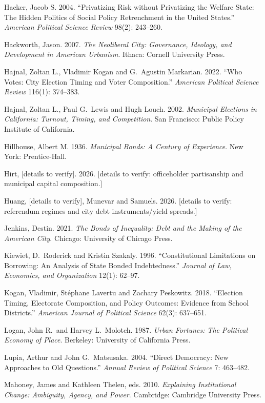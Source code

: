 Hacker, Jacob S. 2004. ``Privatizing Risk without Privatizing the Welfare State: The Hidden Politics of Social Policy Retrenchment in the United States.'' \emph{American Political Science Review} 98(2): 243--260.

Hackworth, Jason. 2007. \emph{The Neoliberal City: Governance, Ideology, and Development in American Urbanism}. Ithaca: Cornell University Press.

Hajnal, Zoltan L., Vladimir Kogan and G.\ Agustin Markarian. 2022. ``Who Votes: City Election Timing and Voter Composition.'' \emph{American Political Science Review} 116(1): 374--383.

Hajnal, Zoltan L., Paul G.\ Lewis and Hugh Louch. 2002. \emph{Municipal Elections in California: Turnout, Timing, and Competition}. San Francisco: Public Policy Institute of California.

Hillhouse, Albert M. 1936. \emph{Municipal Bonds: A Century of Experience}. New York: Prentice-Hall.

Hirt, [details to verify]. 2026. [details to verify: officeholder partisanship and municipal capital composition.]

Huang, [details to verify], Munevar and Samuels. 2026. [details to verify: referendum regimes and city debt instruments/yield spreads.]

Jenkins, Destin. 2021. \emph{The Bonds of Inequality: Debt and the Making of the American City}. Chicago: University of Chicago Press.

Kiewiet, D.\ Roderick and Kristin Szakaly. 1996. ``Constitutional Limitations on Borrowing: An Analysis of State Bonded Indebtedness.'' \emph{Journal of Law, Economics, and Organization} 12(1): 62--97.

Kogan, Vladimir, St\'ephane Lavertu and Zachary Peskowitz. 2018. ``Election Timing, Electorate Composition, and Policy Outcomes: Evidence from School Districts.'' \emph{American Journal of Political Science} 62(3): 637--651.

Logan, John R.\ and Harvey L.\ Molotch. 1987. \emph{Urban Fortunes: The Political Economy of Place}. Berkeley: University of California Press.

Lupia, Arthur and John G.\ Matsusaka. 2004. ``Direct Democracy: New Approaches to Old Questions.'' \emph{Annual Review of Political Science} 7: 463--482.

Mahoney, James and Kathleen Thelen, eds. 2010. \emph{Explaining Institutional Change: Ambiguity, Agency, and Power}. Cambridge: Cambridge University Press.

